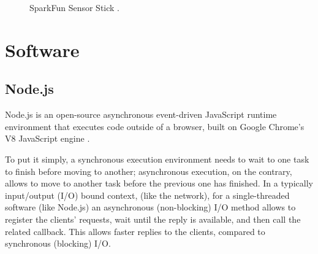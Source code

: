 \begin{center}
	\begin{figure}[ht!]
		\caption{SparkFun Sensor Stick \cite{IMU}.}
	\end{figure}
\end{center}

\section{Software}

\subsection{Node.js}
Node.js is an open-source asynchronous event-driven JavaScript runtime environment that executes code outside of a browser, built on Google Chrome's V8 JavaScript engine \cite{Node.js}.

To put it simply, a synchronous execution environment needs to wait to one task to finish before moving to another; asynchronous execution, on the contrary, allows to move to another task before the previous one has finished. In a typically input/output (I/O) bound context, (like the network), for a single-threaded software (like Node.js) an asynchronous (non-blocking) I/O method allows to register the clients' requests, wait until the reply is available, and then call the related callback. This allows faster replies to the clients, compared to synchronous (blocking) I/O.

